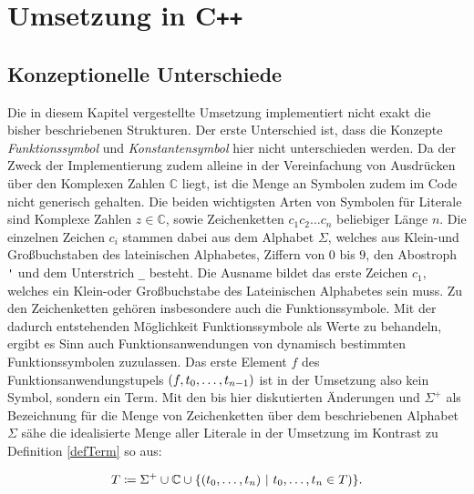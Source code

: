 

\chapter{Umsetzung in C\texttt{++}} \label{secKernUmsetzungInCpp}

\section{Konzeptionelle Unterschiede}
Die in diesem Kapitel vergestellte Umsetzung implementiert nicht exakt die bisher beschriebenen Strukturen. Der erste Unterschied ist, dass die Konzepte \emph{Funktionssymbol} und \emph{Konstantensymbol} hier nicht unterschieden werden. Da der Zweck der Implementierung zudem alleine in der Vereinfachung von Ausdrücken über den Komplexen Zahlen $\mathbb C$ liegt, ist die Menge an Symbolen zudem im Code nicht generisch gehalten. Die beiden wichtigsten Arten von Symbolen für Literale sind Komplexe Zahlen $z \in \mathbb C$, sowie Zeichenketten $c_1 c_2\dots c_n$ beliebiger Länge $n$. Die einzelnen Zeichen $c_i$ stammen dabei aus dem Alphabet $\Sigma$, welches aus Klein-und Großbuchstaben des lateinischen Alphabetes, Ziffern von $0$ bis $9$, den Abostroph \verb|'| und dem Unterstrich \verb|_| besteht. Die Ausname bildet das erste Zeichen $c_1$, welches ein Klein-oder Großbuchstabe des Lateinischen Alphabetes sein muss. Zu den Zeichenketten gehören insbesondere auch die Funktionssymbole. Mit der dadurch entstehenden Möglichkeit Funktionssymbole als Werte zu behandeln, ergibt es Sinn auch Funktionsanwendungen von dynamisch bestimmten Funktionssymbolen zuzulassen. Das erste Element $f$ des Funktionsanwendungstupels $(f, {t}_{0}, \dots, {t}_{n-1})$ ist in der Umsetzung also kein Symbol, sondern ein Term. Mit den bis hier diskutierten Änderungen und $\Sigma^+$ als Bezeichnung für die Menge von Zeichenketten über dem beschriebenen Alphabet $\Sigma$ sähe die idealisierte Menge aller Literale in der Umsetzung im Kontrast zu Definition \ref{defTerm} so aus:

$$T \coloneqq \Sigma^+ \cup \mathbb C \cup \curl*{(\elems t 0 n)~|~ \elems t 0 n \in T)}.$$

